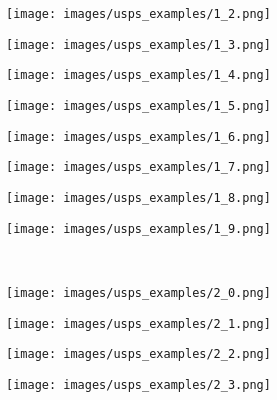 \begin{figure}[t]
\begin{subfigure}[c]{0.07\textwidth}
 \end{subfigure}
 \begin{subfigure}[c]{0.07\textwidth}
  \centering
  \texttt{[image: images/usps\_examples/1\_2.png]}
 \end{subfigure}
 \begin{subfigure}[c]{0.07\textwidth}
  \centering
  \texttt{[image: images/usps\_examples/1\_3.png]}
 \end{subfigure}
 \begin{subfigure}[c]{0.07\textwidth}
  \centering
  \texttt{[image: images/usps\_examples/1\_4.png]}
 \end{subfigure}
 \begin{subfigure}[c]{0.07\textwidth}
  \centering
  \texttt{[image: images/usps\_examples/1\_5.png]}
 \end{subfigure}
 \begin{subfigure}[c]{0.07\textwidth}
  \centering
  \texttt{[image: images/usps\_examples/1\_6.png]}
 \end{subfigure}
 \begin{subfigure}[c]{0.07\textwidth}
  \centering
  \texttt{[image: images/usps\_examples/1\_7.png]}
 \end{subfigure}
 \begin{subfigure}[c]{0.07\textwidth}
  \centering
  \texttt{[image: images/usps\_examples/1\_8.png]}
 \end{subfigure}
 \begin{subfigure}[c]{0.07\textwidth}
  \centering
  \texttt{[image: images/usps\_examples/1\_9.png]}
 \end{subfigure}
 \\
 \begin{subfigure}[c]{0.07\textwidth}
  \centering
  \texttt{[image: images/usps\_examples/2\_0.png]}
 \end{subfigure}
 \begin{subfigure}[c]{0.07\textwidth}
  \centering
  \texttt{[image: images/usps\_examples/2\_1.png]}
 \end{subfigure}
 \begin{subfigure}[c]{0.07\textwidth}
  \centering
  \texttt{[image: images/usps\_examples/2\_2.png]}
 \end{subfigure}
 \begin{subfigure}[c]{0.07\textwidth}
  \centering
  \texttt{[image: images/usps\_examples/2\_3.png]}

\end{subfigure}
\end{figure}
